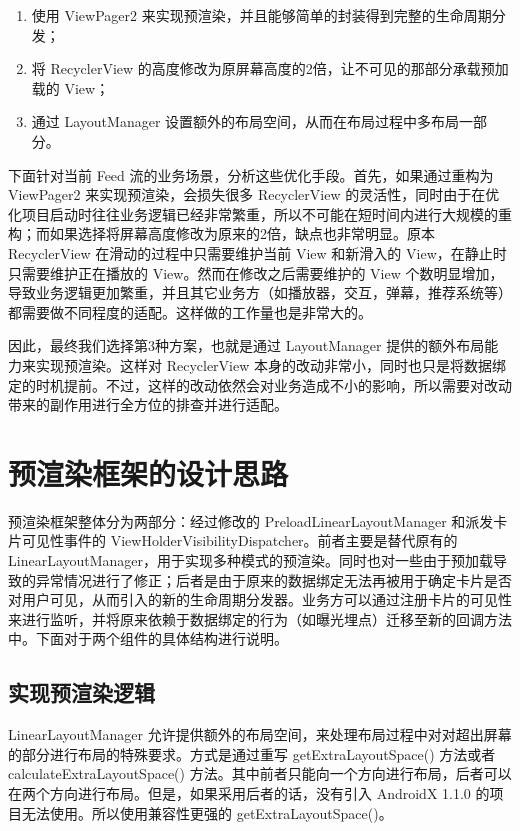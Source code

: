 \begin{enumerate}
    \item 使用 ViewPager2 来实现预渲染，并且能够简单的封装得到完整的生命周期分发；
    \item 将 RecyclerView 的高度修改为原屏幕高度的2倍，让不可见的那部分承载预加载的 View；
    \item 通过 LayoutManager 设置额外的布局空间，从而在布局过程中多布局一部分。
\end{enumerate}

下面针对当前 Feed 流的业务场景，分析这些优化手段。首先，如果通过重构为 ViewPager2 来实现预渲染，会损失很多 RecyclerView 的灵活性，同时由于在优化项目启动时往往业务逻辑已经非常繁重，所以不可能在短时间内进行大规模的重构；而如果选择将屏幕高度修改为原来的2倍，缺点也非常明显。原本 RecyclerView 在滑动的过程中只需要维护当前 View 和新滑入的 View，在静止时只需要维护正在播放的 View。然而在修改之后需要维护的 View 个数明显增加，导致业务逻辑更加繁重，并且其它业务方（如播放器，交互，弹幕，推荐系统等）都需要做不同程度的适配。这样做的工作量也是非常大的。

因此，最终我们选择第3种方案，也就是通过 LayoutManager 提供的额外布局能力来实现预渲染。这样对 RecyclerView 本身的改动非常小，同时也只是将数据绑定的时机提前。不过，这样的改动依然会对业务造成不小的影响，所以需要对改动带来的副作用进行全方位的排查并进行适配。

\section{预渲染框架的设计思路}

预渲染框架整体分为两部分：经过修改的 PreloadLinearLayoutManager 和派发卡片可见性事件的 ViewHolderVisibilityDispatcher。前者主要是替代原有的 LinearLayoutManager，用于实现多种模式的预渲染。同时也对一些由于预加载导致的异常情况进行了修正；后者是由于原来的数据绑定无法再被用于确定卡片是否对用户可见，从而引入的新的生命周期分发器。业务方可以通过注册卡片的可见性来进行监听，并将原来依赖于数据绑定的行为（如曝光埋点）迁移至新的回调方法中。下面对于两个组件的具体结构进行说明。

\subsection{实现预渲染逻辑}

LinearLayoutManager 允许提供额外的布局空间，来处理布局过程中对对超出屏幕的部分进行布局的特殊要求。方式是通过重写 getExtraLayoutSpace() 方法或者 calculateExtraLayoutSpace() 方法。其中前者只能向一个方向进行布局，后者可以在两个方向进行布局。但是，如果采用后者的话，没有引入 AndroidX 1.1.0 的项目无法使用。所以使用兼容性更强的 getExtraLayoutSpace()。

